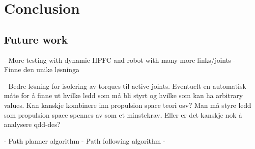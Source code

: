 \chapter{Conclusion}\label{conclusion}


\section{Future work}

- More testing with dynamic HPFC and robot with many more links/joints
- Finne den unike løsninga

- Bedre løsning for isolering av torques til active joints. Eventuelt en automatisk måte for å finne ut hvilke ledd som må bli styrt og hvilke som kan ha arbitrary values. Kan kanskje kombinere inn propulsion space teori osv? Man må styre ledd som propulsion space spennes av som et minstekrav.
Eller er det kanskje nok å analysere qdd-des?

- Path planner algorithm
- Path following algorithm
- 